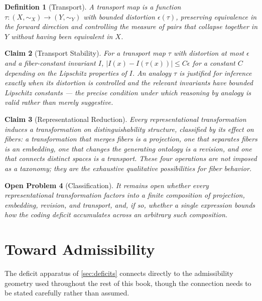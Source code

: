 \documentclass[12pt]{report}
\newtheorem{definition}{Definition}[section]
\newtheorem{claim}[definition]{Claim}
\newtheorem{openproblem}[definition]{Open Problem}
\begin{document}
\begin{definition}[Transport]
\label{def:transport}
A \emph{transport map} is a function $\tau : (X,\sim_X) \to (Y,\sim_Y)$
with bounded distortion $\epsilon(\tau)$, preserving equivalence in the
forward direction and controlling the measure of pairs that collapse
together in $Y$ without having been equivalent in $X$.
\end{definition}

\begin{claim}[Transport Stability]
\label{thm:transport-stability}
For a transport map $\tau$ with distortion at most $\epsilon$ and a
fiber-constant invariant $I$, $|I(x) - I(\tau(x))| \leq C\epsilon$ for a
constant $C$ depending on the Lipschitz properties of $I$. An analogy
$\tau$ is justified for inference exactly when its distortion is
controlled and the relevant invariants have bounded Lipschitz constants
--- the precise condition under which reasoning by analogy is valid
rather than merely suggestive.
\end{claim}

\begin{claim}[Representational Reduction]
\label{prop:rep-reduction}
Every representational transformation induces a transformation on
distinguishability structure, classified by its effect on fibers: a
transformation that merges fibers is a projection, one that separates
fibers is an embedding, one that changes the generating ontology is a
revision, and one that connects distinct spaces is a transport. These
four operations are not imposed as a taxonomy; they are the exhaustive
qualitative possibilities for fiber behavior.
\end{claim}

\begin{openproblem}[Classification]
\label{conj:classification}
It remains open whether every representational transformation factors
into a finite composition of projection, embedding, revision, and
transport, and, if so, whether a single expression bounds how the coding
deficit accumulates across an arbitrary such composition.
\end{openproblem}

\section{Toward Admissibility}
\label{sec:toward-admissibility}

The deficit apparatus of \cref{sec:deficits} connects directly to the
admissibility geometry used throughout the rest of this book, though the
connection needs to be stated carefully rather than assumed.
\end{document}
